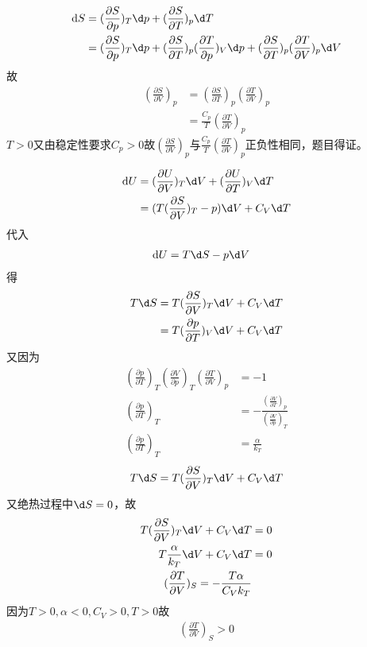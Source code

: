 \documentclass{phyasgn}
\begin{document}
\begin{sol}[3]
    \begin{align*}
        \mathrm{d}S&=(\frac{\partial S}{\partial p})_T\d p+(\frac{\partial S}{\partial T})_p\d T\\
        &=(\frac{\partial S}{\partial p})_T\d p+(\frac{\partial S}{\partial T})_p(\frac{\partial T}{\partial p})_V\d p+(\frac{\partial S}{\partial T})_p(\frac{\partial T}{\partial V})_p\d V
    \end{align*}
    故
    \begin{align*}
        (\frac{\partial S}{\partial V})_p&=(\frac{\partial S}{\partial T})_p(\frac{\partial T}{\partial V})_p\\
        &=\frac{C_p}{T}(\frac{\partial T}{\partial V})_p
    \end{align*}
    $T>0$又由稳定性要求$C_p>0$故$(\frac{\partial S}{\partial V})_p$与$\frac{C_p}{T}(\frac{\partial T}{\partial V})_p$正负性相同，题目得证。
\end{sol}\par


\begin{sol}[4]
    \begin{align*}
        \mathrm{d}U&=(\frac{\partial U}{\partial V})_T\d V+(\frac{\partial U}{\partial T})_V\d T\\
        &=(T(\frac{\partial S}{\partial V})_T-p)\d V+C_V\d T
    \end{align*}
    代入
    \begin{align*}
        \mathrm{d}U&=T\d S-p\d V
    \end{align*}
    得
    \begin{align*}
        T\d S&=T(\frac{\partial S}{\partial V})_T\d V+C_V\d T\\
        &=T(\frac{\partial p}{\partial T})_V\d V+C_V\d T
    \end{align*}
    又因为
    \begin{align*}
        (\frac{\partial p}{\partial T})_T(\frac{\partial V}{\partial p})_T(\frac{\partial T}{\partial V})_p&=-1\\
        (\frac{\partial p}{\partial T})_T&=-\frac{(\frac{\partial V}{\partial T})_p}{(\frac{\partial V}{\partial p})_T}\\
        (\frac{\partial p}{\partial T})_T&=\frac{\alpha}{k_T}
    \end{align*}
    \begin{align*}
        T\d S=T(\frac{\partial S}{\partial V})_T\d V+C_V\d T
    \end{align*}
    又绝热过程中$\d S=0$，故
    \begin{align*}
        T(\frac{\partial S}{\partial V})_T\d V+C_V\d T&=0\\
        T\frac{\alpha}{k_T}\d V+C_V\d T&=0\\
        (\frac{\partial T}{\partial V})_S=-\frac{T\alpha}{C_Vk_T}
    \end{align*}
    因为$T>0,\alpha<0,C_V>0,T>0$故
    \begin{align*}
        (\frac{\partial T}{\partial V})_S>0
    \end{align*}
\end{sol}\par
\end{document}

